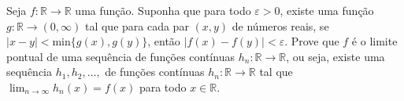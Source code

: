 Seja \(f\colon \mathbb{R}\to \mathbb{R}\) uma função. Suponha que para todo \(\varepsilon >0\), existe uma função \(g\colon \mathbb{R}\to (0,\infty)\) tal que para cada par \((x,y)\) de números reais, se \(|x-y|<\text{min}\{g(x),g(y)\}\), então \(|f(x)-f(y)|<\varepsilon\). Prove que \(f\) é o limite pontual de uma sequência de funções contínuas \(h_n\colon \mathbb{R}\to \mathbb{R}\), ou seja, existe uma sequência \(h_1,h_2,\dots,\) de funções contínuas \(h_n\colon \mathbb{R}\to \mathbb{R}\) tal que \(\lim_{n\to \infty}h_n(x)=f(x)\) para todo \(x\in \mathbb{R}\).
